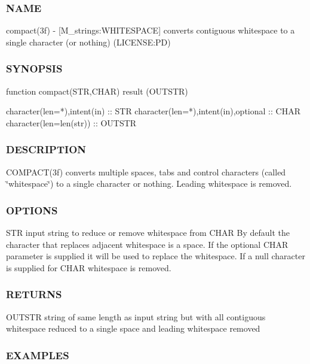 \subsubsection*{N\+A\+ME}

compact(3f) -\/ \mbox{[}M\+\_\+strings\+:W\+H\+I\+T\+E\+S\+P\+A\+CE\mbox{]} converts contiguous whitespace to a single character (or nothing) (L\+I\+C\+E\+N\+SE\+:PD) 

\subsubsection*{S\+Y\+N\+O\+P\+S\+IS}

\begin{DoxyVerb}function compact(STR,CHAR) result (OUTSTR)

 character(len=*),intent(in)          :: STR
 character(len=*),intent(in),optional :: CHAR
 character(len=len(str))              :: OUTSTR
\end{DoxyVerb}
 \subsubsection*{D\+E\+S\+C\+R\+I\+P\+T\+I\+ON}

C\+O\+M\+P\+A\+C\+T(3f) converts multiple spaces, tabs and control characters (called \char`\"{}whitespace\char`\"{}) to a single character or nothing. Leading whitespace is removed.

\subsubsection*{O\+P\+T\+I\+O\+NS}

S\+TR input string to reduce or remove whitespace from C\+H\+AR By default the character that replaces adjacent whitespace is a space. If the optional C\+H\+AR parameter is supplied it will be used to replace the whitespace. If a null character is supplied for C\+H\+AR whitespace is removed. \subsubsection*{R\+E\+T\+U\+R\+NS}

O\+U\+T\+S\+TR string of same length as input string but with all contiguous whitespace reduced to a single space and leading whitespace removed

\subsubsection*{E\+X\+A\+M\+P\+L\+ES}

